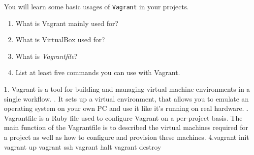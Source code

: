 \documentclass{report}
\begin{document}
\begin{problem}

You will learn some basic usages of \texttt{Vagrant} in your projects.

\begin{enumerate}
\item What is Vagrant mainly used for?
\item What is VirtualBox used for?
\item What is \textit{Vagrantfile}?
\item List at least five commands you can use with Vagrant.
\end{enumerate}

  \begin{answer}{35em}
  1. Vagrant is a tool for building and managing virtual machine environments in a single workflow. \newline {}. It sets up a virtual environment, that allows you to emulate an operating system on your own PC and use it like it's running on real hardware. \newline {}. Vagrantfile is a Ruby file used to configure Vagrant on a per-project basis. The main function of the Vagrantfile is to described the virtual machines required for a project as well as how to configure and provision these machines. \newline\newline
  4.vagrant init \newline
  vagrant up \newline
  vagrant ssh \newline
  vagrant halt \newline
  vagrant destroy
  \end{answer}

\end{problem}
\end{document}
